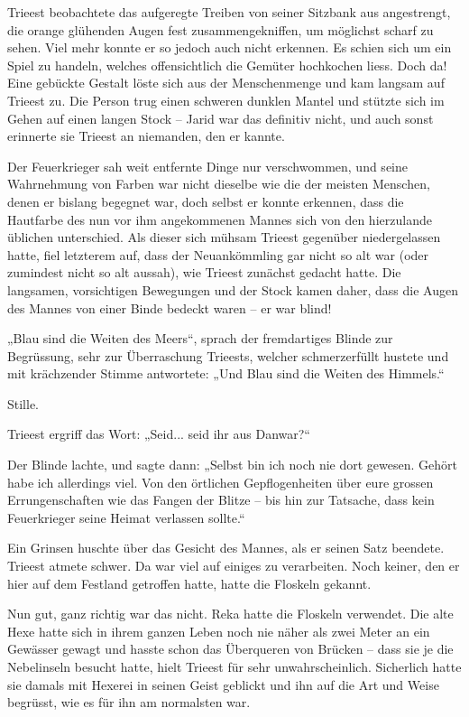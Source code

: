 \trennzeichen



Trieest beobachtete das aufgeregte Treiben von seiner Sitzbank aus angestrengt, die orange glühenden Augen fest zusammengekniffen, um möglichst scharf zu sehen. Viel mehr konnte er so jedoch auch nicht erkennen. Es schien sich um ein Spiel zu handeln, welches offensichtlich die Gemüter hochkochen liess. Doch da! Eine gebückte Gestalt löste sich aus der Menschenmenge und kam langsam auf Trieest zu. Die Person trug einen schweren dunklen Mantel und stützte sich im Gehen auf einen langen Stock – Jarid war das definitiv nicht, und auch sonst erinnerte sie Trieest an niemanden, den er kannte.

Der Feuerkrieger sah weit entfernte Dinge nur verschwommen, und seine Wahrnehmung von Farben war nicht dieselbe wie die der meisten Menschen, denen er bislang begegnet war, doch selbst er konnte erkennen, dass die Hautfarbe des nun vor ihm angekommenen Mannes sich von den hierzulande üblichen unterschied. Als dieser sich mühsam Trieest gegenüber niedergelassen hatte, fiel letzterem auf, dass der Neuankömmling gar nicht so alt war (oder zumindest nicht so alt aussah), wie Trieest zunächst gedacht hatte. Die langsamen, vorsichtigen Bewegungen und der Stock kamen daher, dass die Augen des Mannes von einer Binde bedeckt waren – er war blind!

„Blau sind die Weiten des Meers“, sprach der fremdartiges Blinde zur Begrüssung, sehr zur Überraschung Trieests, welcher schmerzerfüllt hustete und mit krächzender Stimme antwortete: „Und Blau sind die Weiten des Himmels.“

Stille.

Trieest ergriff das Wort: „Seid... seid ihr aus Danwar?“

Der Blinde lachte, und sagte dann: „Selbst bin ich noch nie dort gewesen. Gehört habe ich allerdings viel. Von den örtlichen Gepflogenheiten über eure grossen Errungenschaften wie das Fangen der Blitze – bis hin zur Tatsache, dass kein Feuerkrieger seine Heimat verlassen sollte.“

Ein Grinsen huschte über das Gesicht des Mannes, als er seinen Satz beendete. Trieest atmete schwer. Da war viel auf einiges zu verarbeiten. Noch keiner, den er hier auf dem Festland getroffen hatte, hatte die Floskeln gekannt.

Nun gut, ganz richtig war das nicht. Reka hatte die Floskeln verwendet. Die alte Hexe hatte sich in ihrem ganzen Leben noch nie näher als zwei Meter an ein Gewässer gewagt und hasste schon das Überqueren von Brücken – dass sie je die Nebelinseln besucht hatte, hielt Trieest für sehr unwahrscheinlich. Sicherlich hatte sie damals mit Hexerei in seinen Geist geblickt und ihn auf die Art und Weise begrüsst, wie es für ihn am normalsten war.

